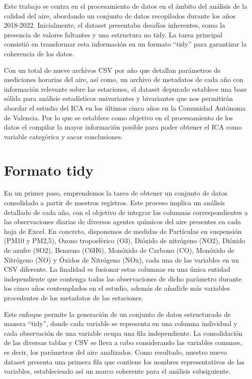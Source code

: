 \documentclass[notspecified,article,submit,moreauthors,pdftex]{Definitions/mdpi}
\begin{document}
Este trabajo se centra en el procesamiento de datos en el ámbito del
análisis de la calidad del aire, abordando un conjunto de datos
recopilados durante los años 2018-2022. Inicialmente, el dataset
presentaba desafíos inherentes, como la presencia de valores faltantes y
una estructura no tidy. La tarea principal consistió en transformar esta
información en un formato ``tidy'' para garantizar la coherencia de los
datos.

Con un total de nueve archivos CSV por año que detallan parámetros de
mediciones horarias del aire, así como, un archivo de metadatos de cada
año con información relevante sobre las estaciones, el dataset depurado
establece una base sólida para análisis estadísticos univariantes y
bivariantes que nos permitirán abordar el estudio del ICA en los últimos
cinco años en la Comunidad Autónoma de Valencia. Por lo que se establece
como objetivo en el procesamiento de los datos el compilar la mayor
información posible para poder obtener el ICA como variable categórica y
sacar conclusiones.

\hypertarget{formato-tidy}{%
\section{Formato tidy}\label{formato-tidy}}

En un primer paso, emprendemos la tarea de obtener un conjunto de datos
consolidado a partir de nuestros registros. Este proceso implica un
análisis detallado de cada año, con el objetivo de integrar las columnas
correspondientes a las observaciones diarias de diversos agentes
químicos del aire presentes en cada hoja de Excel. En concreto,
disponemos de medidas de Partículas en suspensión (PM10 y PM2,5), Ozono
troposférico (O3), Dióxido de nitrógeno (NO2), Dióxido de azufre (SO2),
Benzeno (C6H6), Monóxido de Carbono (CO), Monóxido de Nitrógeno (NO) y
Óxidos de Nitrógeno (NOx), cada una de las variables en un CSV
diferente. La finalidad es fusionar estas columnas en una única entidad
independiente que contenga todas las observaciones de dicho parámetro
durante los cinco años contemplados en el estudio, además de añadirle
más variables procedentes de los metadatos de las estaciones.

Este enfoque permite la generación de un conjunto de datos estructurado
de manera ``tidy'', donde cada variable se representa en una columna
individual y cada observación de una variable ocupa una fila
independiente. La consolidación de las diversas tablas y CSV se lleva a
cabo considerando las variables comunes, es decir, los parámetros del
aire analizados. Como resultado, nuestro nuevo dataset presenta una
primera fila que contiene los nombres representativos de las variables,
estableciendo así un marco coherente para el análisis subsiguiente.
\end{document}
